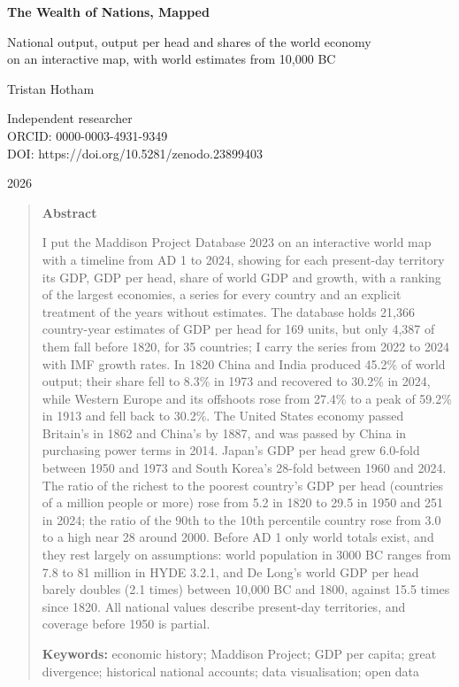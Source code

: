 \documentclass[11pt,a4paper]{article}
\begin{document}
\begin{center}
{\Large\bfseries The Wealth of Nations, Mapped\par}
\vspace{0.4em}
{\large National output, output per head and shares of the world economy\\on an interactive map, with world estimates from 10,000 BC\par}
\vspace{1.2em}
{\large Tristan Hotham\par}
\vspace{0.3em}
{\small Independent researcher\\
ORCID: 0000-0003-4931-9349\\
DOI: https://doi.org/10.5281/zenodo.23899403\par}
\vspace{0.8em}
2026
\end{center}

\begin{quote}
\small
\begin{center}\textbf{Abstract}\end{center}
I put the Maddison Project Database 2023 \citep{mpd2023} on an interactive world map with a timeline from AD 1 to 2024, showing for each present-day territory its GDP, GDP per head, share of world GDP and growth, with a ranking of the largest economies, a series for every country and an explicit treatment of the years without estimates. The database holds 21,366 country-year estimates of GDP per head for 169 units, but only 4,387 of them fall before 1820, for 35 countries; I carry the series from 2022 to 2024 with IMF growth rates. In 1820 China and India produced 45.2\% of world output; their share fell to 8.3\% in 1973 and recovered to 30.2\% in 2024, while Western Europe and its offshoots rose from 27.4\% to a peak of 59.2\% in 1913 and fell back to 30.2\%. The United States economy passed Britain's in 1862 and China's by 1887, and was passed by China in purchasing power terms in 2014. Japan's GDP per head grew 6.0-fold between 1950 and 1973 and South Korea's 28-fold between 1960 and 2024. The ratio of the richest to the poorest country's GDP per head (countries of a million people or more) rose from 5.2 in 1820 to 29.5 in 1950 and 251 in 2024; the ratio of the 90th to the 10th percentile country rose from 3.0 to a high near 28 around 2000. Before AD 1 only world totals exist, and they rest largely on assumptions: world population in 3000 BC ranges from 7.8 to 81 million in HYDE 3.2.1, and De Long's world GDP per head barely doubles (2.1 times) between 10,000 BC and 1800, against 15.5 times since 1820. All national values describe present-day territories, and coverage before 1950 is partial.

\textbf{Keywords:} economic history; Maddison Project; GDP per capita; great divergence; historical national accounts; data visualisation; open data
\end{quote}
\end{document}
